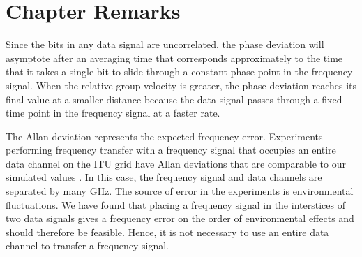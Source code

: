 \section{Chapter Remarks}

Since the bits in any data signal are uncorrelated, the phase deviation will asymptote after an averaging time that corresponds approximately to the time that it takes a single bit to slide through a constant phase point in the frequency signal. When the relative group velocity is greater, the phase deviation reaches its final value at a smaller distance because the data signal passes through a fixed time point in the frequency signal at a faster rate. 

The Allan deviation represents the expected frequency error. Experiments performing frequency transfer with a frequency signal that occupies an entire data channel on the ITU grid have Allan deviations that are comparable to our simulated values \cite{Serrano2013,cantin2017progress}. In this case, the frequency signal and data channels are separated by many GHz. The source of error in the experiments is environmental fluctuations. We have found that placing a frequency signal in the interstices of two data signals gives a frequency error on the order of environmental effects and should therefore be feasible. Hence, it is not necessary to use an entire data channel to transfer a frequency signal.